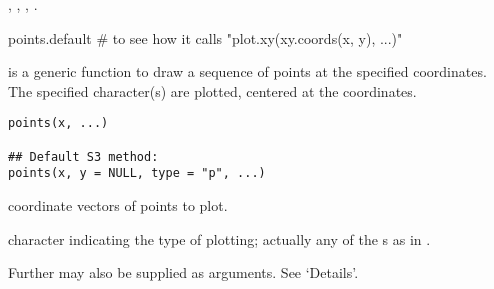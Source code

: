 %
\begin{SeeAlso}\relax
{},
,
,
.
\end{SeeAlso}
%
\begin{Examples}
\begin{ExampleCode}
points.default # to see how it calls "plot.xy(xy.coords(x, y), ...)"
\end{ExampleCode}
\end{Examples}
\graphicspath{{C:/architect-build/temp/r/i386/R-2.15.2/library/graphics/help/figures/}}
%
\begin{Description}\relax
{} is a generic function to draw a sequence of points at
the specified coordinates.  The specified character(s) are plotted,
centered at the coordinates.
\end{Description}
%
\begin{Usage}
\begin{verbatim}
points(x, ...)

## Default S3 method:
points(x, y = NULL, type = "p", ...)
\end{verbatim}
\end{Usage}
%
\begin{Arguments}
\begin{ldescription}
\item[\code{x, y}] coordinate vectors of points to plot.
\item[\code{type}] character indicating the type of plotting; actually any of
the s as in .
\item[\code{...}] Further  may also be supplied as
arguments.  See `Details'.
\end{ldescription}
\end{Arguments}
%
